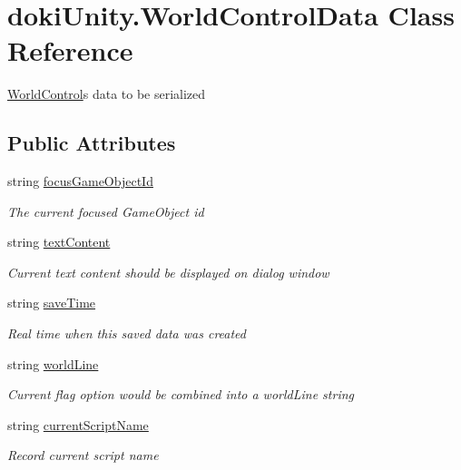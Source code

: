 \hypertarget{classdoki_unity_1_1_world_control_data}{}\section{doki\+Unity.\+World\+Control\+Data Class Reference}
\label{classdoki_unity_1_1_world_control_data}


\hyperlink{classdoki_unity_1_1_world_control}{World\+Control}\textquotesingle{}s data to be serialized  


\subsection*{Public Attributes}
\begin{DoxyCompactItemize}
\item 
string \hyperlink{classdoki_unity_1_1_world_control_data_a0319725497feb339c9454a9558944a4a}{focus\+Game\+Object\+Id}
\begin{DoxyCompactList}\small\item\em The current focused Game\+Object id \end{DoxyCompactList}\item 
string \hyperlink{classdoki_unity_1_1_world_control_data_af3e5da1c0bf42d6f3a3b8fdf25380479}{text\+Content}
\begin{DoxyCompactList}\small\item\em Current text content should be displayed on dialog window \end{DoxyCompactList}\item 
string \hyperlink{classdoki_unity_1_1_world_control_data_af4ea7ace0548e2004bf9fa89f9a480a2}{save\+Time}
\begin{DoxyCompactList}\small\item\em Real time when this saved data was created \end{DoxyCompactList}\item 
string \hyperlink{classdoki_unity_1_1_world_control_data_aa5f6043ea14303922a5f10e787af2786}{world\+Line}
\begin{DoxyCompactList}\small\item\em Current flag option would be combined into a world\+Line string \end{DoxyCompactList}\item 
string \hyperlink{classdoki_unity_1_1_world_control_data_a58596f3ce00cf0090848847a652768ec}{current\+Script\+Name}
\begin{DoxyCompactList}\small\item\em Record current script name \end{DoxyCompactList}\item 

\end{DoxyCompactItemize}
